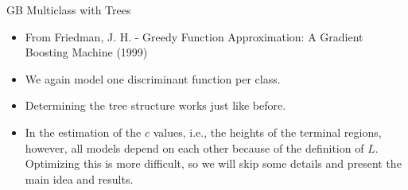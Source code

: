 \begin{vbframe}{GB Multiclass with Trees}

\begin{itemize}
  \item From Friedman, J. H. - Greedy Function Approximation: A Gradient Boosting Machine (1999)
  \item We again model one discriminant function per class.    
  \item Determining the tree structure works just like before.
\item In the estimation of the $c$ values, i.e., the heights of the terminal regions, however, all models depend on each other because of the definition
of $L$. Optimizing this is more difficult, so we will skip some details and present the main idea and results.
\end{itemize}

\framebreak









\end{vbframe}
